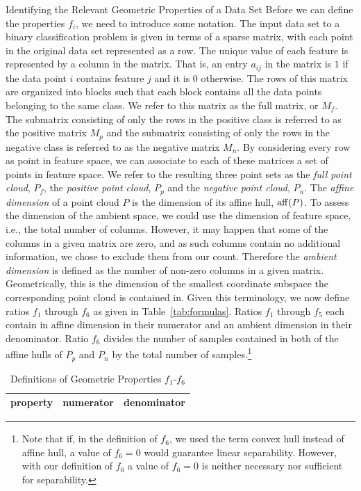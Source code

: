 \documentclass{llncs}
\begin{document}
\begin{section}{Identifying the Relevant Geometric Properties of a Data Set}
Before we can define the properties $f_i$, we need to introduce some notation. The input data set to a binary classification problem is given in terms of a sparse matrix, with each point in the original data set represented as a row. The unique value of each feature is represented by a column in the matrix. That is, an entry $a_{ij}$ in the matrix is $1$ if the data point $i$ contains feature $j$ and it is $0$ otherwise. The rows of this matrix are organized into blocks such that each block contains all the data points belonging to the same class. We refer to this matrix as the full matrix, or $M_f$. The submatrix consisting of only the rows in the positive class is referred to as the positive matrix $M_p$ and the submatrix consisting of only the rows in the negative class is referred to as the negative matrix $M_n$. By considering every row as point in feature space, we can associate to each of these matrices a set of points in feature space.  We refer to the resulting three point sets as the {\em full point cloud}, $P_f$, the {\em positive point cloud}, $P_p$ and the {\em negative point cloud}, $P_n$. The {\em affine dimension} of a point cloud $P$ is the dimension of its affine hull, $\operatorname{aff}(P)$. To assess the dimension of the ambient space, we could use the dimension of feature space, i.e., the total number of columns. However, it may happen that some of the columns in a given matrix are zero, and as such columns contain no additional information, we chose to exclude them from our count. Therefore the {\em ambient dimension} is defined as the number of non-zero columns in a given matrix. Geometrically, this is the dimension of the smallest coordinate subspace the corresponding point cloud is contained in. Given this terminology, we now define ratios $f_1$ through $f_6$ as given in Table~\ref{tab:formulas}. Ratios $f_1$ through $f_5$ each contain in affine dimension in their numerator and an ambient dimension in their denominator. Ratio $f_6$ divides the number of samples contained in both of the affine hulls of $P_p$ and $P_n$ by the total number of samples.\footnote{Note that if, in the definition of $f_6$, we used the term convex hull instead of affine hull, a value of $f_6=0$ would guarantee linear separability. However, with our definition of $f_6$ a value of $f_6=0$ is neither necessary nor sufficient for separability.}

\begin{table}[ht]
\centering
\caption{Definitions of Geometric Properties $f_1$-$f_6$}
\begin{tabular}{l l r }
\hline \hline
property&numerator&denominator \\
\hline


\end{tabular}
\end{table}
\end{section}
\end{document}
